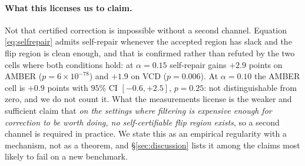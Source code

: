 \documentclass[review,number,doubleblind]{elsarticle}
\theoremstyle{plain}
\theoremstyle{definition}
\theoremstyle{remark}
\begin{document}
\begin{table}[t]
\centering
\caption{Self-certified repair: flipping the model's answer on the bottom $q=0.02$ of $s$ and
certifying the mixture, against filtering, under the identical protocol ($400$ paired splits,
$\delta=0.10$). $r_r$ is the flip region's own risk, i.e.\ the model's accuracy there. All
$p$-values are two-sided paired $t$-tests on the $400$ paired differences. The gain is
negative wherever the abort rate is large, and positive only where $r_r$ is small.}
\label{tab:selfrepair}
\small
{}
\end{table}

\paragraph{What this licenses us to claim.}
Not that certified correction is impossible without a second channel. Equation
\eqref{eq:selfrepair} admits self-repair whenever the accepted region has slack and the flip
region is clean enough, and that is confirmed rather than refuted by the two cells where both
conditions hold: at $\alpha=0.15$ self-repair gains $+2.9$ points on AMBER
($p=6\times10^{-78}$) and $+1.9$ on VCD ($p=0.006$). At $\alpha=0.10$ the AMBER cell is
$+0.9$ points with $95\%$ CI $[-0.6,+2.5]$, $p=0.25$: not distinguishable from zero, and we do
not count it. What the measurements license is the weaker and sufficient claim that \emph{on the
settings where filtering is expensive enough for correction to be worth doing, no
self-certifiable flip region exists}, so a second channel is required in practice. We state this
as an empirical regularity with a mechanism, not as a theorem, and \S\ref{sec:discussion} lists
it among the claims most likely to fail on a new benchmark.
\end{document}

